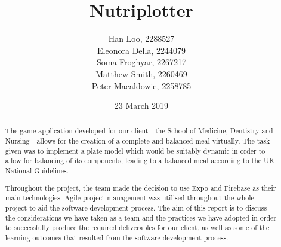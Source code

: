 \documentclass{l3proj}
\begin{document}
\title{Nutriplotter}

\author{Han Loo, 2288527\\
        Eleonora Della, 2244079\\
        Soma Froghyar, 2267217\\
        Matthew Smith, 2260469\\
        Peter Macaldowie, 2258785}

\date{23 March 2019}

\maketitle

\begin{abstract}

The game application developed for our client - the School of Medicine, Dentistry and Nursing - allows for the creation of a complete and balanced meal virtually. The task given was to implement a plate model which would be suitably dynamic in order to allow for balancing of its components, leading to a balanced meal according to the UK National Guidelines.\par
Throughout the project, the team made the decision to use Expo and Firebase as their main technologies. Agile project management was utilised throughout the whole project to aid the software development process. The aim of this report is to discuss the considerations we have taken as a team and the practices we have adopted in order to successfully produce the required deliverables for our client, as well as some of the learning outcomes that resulted from the software development process.\par
\end{abstract}

\educationalconsent

\newpage

\end{document}
